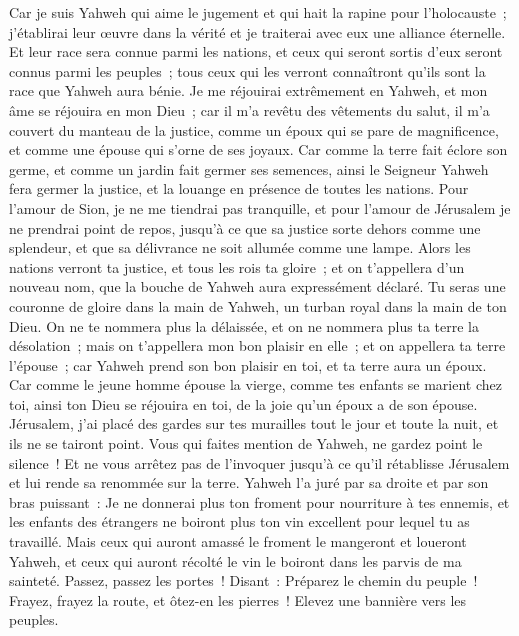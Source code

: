 \begin{multicols}{2}
Car je suis Yahweh qui aime le jugement et qui hait la rapine pour l'holocauste~; j'établirai leur œuvre dans la vérité et je traiterai avec eux une alliance éternelle.
Et leur race sera connue parmi les nations, et ceux qui seront sortis d'eux seront connus parmi les peuples~; tous ceux qui les verront connaîtront qu'ils sont la race que Yahweh aura bénie.
Je me réjouirai extrêmement en Yahweh, et mon âme se réjouira en mon Dieu~; car il m'a revêtu des vêtements du salut, il m'a couvert du manteau de la justice, comme un époux qui se pare de magnificence, et comme une épouse qui s'orne de ses joyaux.
Car comme la terre fait éclore son germe, et comme un jardin fait germer ses semences, ainsi le Seigneur Yahweh fera germer la justice, et la louange en présence de toutes les nations.
\VerseOne{}Pour l'amour de Sion, je ne me tiendrai pas tranquille, et pour l'amour de Jérusalem je ne prendrai point de repos, jusqu'à ce que sa justice sorte dehors comme une splendeur, et que sa délivrance ne soit allumée comme une lampe.
Alors les nations verront ta justice, et tous les rois ta gloire~; et on t'appellera d'un nouveau nom, que la bouche de Yahweh aura expressément déclaré.
Tu seras une couronne de gloire dans la main de Yahweh, un turban royal dans la main de ton Dieu.
On ne te nommera plus la délaissée, et on ne nommera plus ta terre la désolation~; mais on t'appellera mon bon plaisir en elle~; et on appellera ta terre l'épouse~; car Yahweh prend son bon plaisir en toi, et ta terre aura un époux.
Car comme le jeune homme épouse la vierge, comme tes enfants se marient chez toi, ainsi ton Dieu se réjouira en toi, de la joie qu'un époux a de son épouse.
Jérusalem, j'ai placé des gardes sur tes murailles tout le jour et toute la nuit, et ils ne se tairont point. Vous qui faites mention de Yahweh, ne gardez point le silence~!
Et ne vous arrêtez pas de l'invoquer jusqu'à ce qu'il rétablisse Jérusalem et lui rende sa renommée sur la terre.
Yahweh l'a juré par sa droite et par son bras puissant~: Je ne donnerai plus ton froment pour nourriture à tes ennemis, et les enfants des étrangers ne boiront plus ton vin excellent pour lequel tu as travaillé.
Mais ceux qui auront amassé le froment le mangeront et loueront Yahweh, et ceux qui auront récolté le vin le boiront dans les parvis de ma sainteté.
Passez, passez les portes~! Disant~: Préparez le chemin du peuple~! Frayez, frayez la route, et ôtez-en les pierres~! Elevez une bannière vers les peuples.

\end{multicols}
